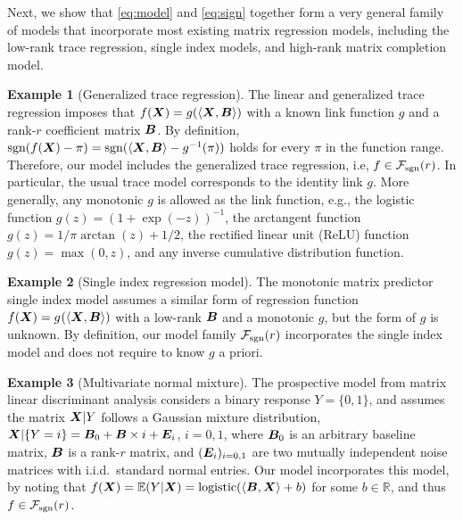 \documentclass[aos]{imsart}
\theoremstyle{definition}
\newtheorem{example}{Example}
\def\sign{\textup{sgn}}
\def\caliF{\tF_{\textup{sgn}}}
\begin{document}
Next, we show that \eqref{eq:model} and \eqref{eq:sign} together form a very general family of models that incorporate most existing matrix regression models, including the low-rank trace regression, single index models, and high-rank matrix completion model. 

\begin{example}[Generalized trace regression] The linear and generalized trace regression \cite{zhou2014regularized, wang2017generalized, fan2019generalized} imposes that $f(\bm X)=g(\langle \bm X, \bm B \rangle)$ with a known link function $g$ and a rank-$r$ coefficient matrix $\bm B$. By definition, $\sign(f(\mX)-\pi)=\sign(\langle \mX, \mB \rangle -g^{-1}(\pi))$ holds for every $\pi$ in the function range. Therefore, our model includes the generalized trace regression, i.e, $f \in \caliF(r)$. In particular, the usual trace model corresponds to the identity link $g$. More generally, any monotonic $g$ is allowed as the link function, e.g., the logistic function $g(z)=(1+\exp(-z))^{-1}$, the arctangent function $g(z)={1/\pi}\arctan(z)+{1/2}$, the rectified linear unit (ReLU) function $g(z)=\max(0,z)$, and any inverse cumulative distribution function. 
\end{example}

\begin{example}[Single index regression model] 
The monotonic matrix predictor single index model \citep{balabdaoui2019least,ganti2017learning} assumes a similar form of regression function $f(\bm X)=g^{}(\langle \bm X, \bm B\rangle)$ with a low-rank $\bm B$ and a monotonic $g$, but the form of $g$ is unknown. By definition, our model family $\caliF(r)$ incorporates the single index model and does not require to know $g$ a priori. 
\end{example}

\begin{example}[Multivariate normal mixture]
The prospective model from matrix linear discriminant analysis \citep{hu2020matrix} considers a binary response $Y=\{0,1\}$, and assumes the matrix $\bm X|Y$ follows a Gaussian mixture distribution, $\bm X|\{Y=i\} = \bm B_0 + \bm B\times i + \bm{E}_i$, $i=0,1$, where $\bm B_0$ is an arbitrary baseline matrix, $\bm B$ is a rank-$r$ matrix, and $(\bm{E}_i)_{i=0,1}$ are two mutually independent noise matrices with i.i.d.\ standard normal entries. Our model incorporates this model, by noting that $f(\bm X)=\mathbb{E}(Y|\bm X)=\text{logistic}(\langle \bm B, \bm X \rangle+b)$ for some $b\in\mathbb{R}$, and thus $f\in \caliF(r)$. 
\end{example}
\end{document}
